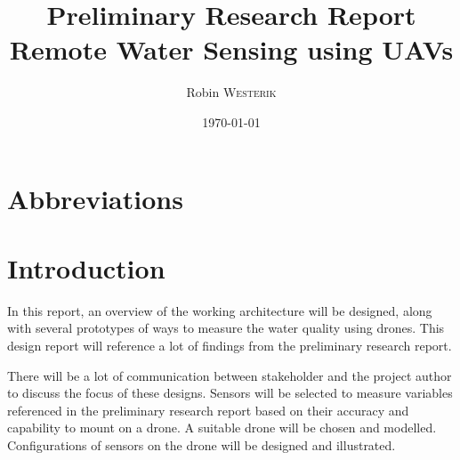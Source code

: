 \documentclass[11pt, a4paper]{article}
\title{Preliminary Research Report\\Remote Water Sensing using UAVs}
\author{Robin \textsc{Westerik}}
\date{\today}
\begin{document}



\tableofcontents
\pagebreak

\section{Abbreviations}
\sffamily\footnotesize
\printnomenclature
\rmfamily\normalsize

\section{Introduction}

In this report, an overview of the working architecture will be designed, along with several prototypes of ways to measure the water quality using drones. This design report will reference a lot of findings from the preliminary research report.

There will be a lot of communication between stakeholder and the project author to discuss the focus of these designs. Sensors will be selected to measure variables referenced in the preliminary research report based on their accuracy and capability to mount on a drone. A suitable drone will be chosen and modelled. Configurations of sensors on the drone will be designed and illustrated.







\newpage
\printbibliography 
\end{document}
